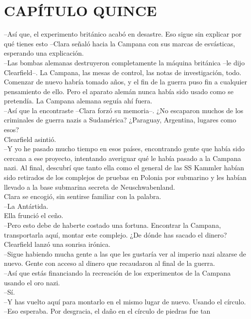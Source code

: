 \chapter*{CAPÍTULO QUINCE}
--Así que, el experimento británico acabó en desastre. Eso sigue sin
explicar por qué tienes esto --Clara señaló hacia la Campana con sus
marcas de esvásticas, esperando una explicación.\\
--Las bombas alemanas destruyeron completamente la máquina británica
--le dijo Clearfield--. La Campana, las mesas de control, las notas de
investigación, todo. Comenzar de nuevo habría tomado años, y el fin de
la guerra puso fin a cualquier pensamiento de ello. Pero el aparato
alemán nunca había sido usado como se pretendía. La Campana alemana
seguía ahí fuera.\\
--Así que la encontraste --Clara forzó su memoria--. ¿No escaparon
muchos de los criminales de guerra nazis a Sudamérica? ¿Paraguay,
Argentina, lugares como esos?\\
Clearfield asintió.\\
--Y yo he pasado mucho tiempo en esos países, encontrando gente que
había sido cercana a ese proyecto, intentando averiguar qué le había
pasado a la Campana nazi. Al final, descubrí que tanto ella como el
general de las SS Kammler habían sido retirados de los complejos de
pruebas en Polonia por submarino y les habían llevado a la base
submarina secreta de Neuschwabenland.\\
Clara se encogió, sin sentirse familiar con la palabra.\\
--La Antártida.\\
Ella frunció el ceño.\\
--Pero esto debe de haberte costado una fortuna. Encontrar la Campana,
transportarla aquí, montar este complejo. ¿De dónde has sacado el
dinero?\\
Clearfield lanzó una sonrisa irónica.\\
--Sigue habiendo mucha gente a las que les gustaría ver al imperio nazi
alzarse de nuevo. Gente con acceso al dinero que recaudaron al final de
la guerra.\\
--Así que estás financiando la recreación de los experimentos de la
Campana usando el oro nazi.\\
--Sí.\\
--Y has vuelto aquí para montarlo en el mismo lugar de nuevo. Usando el
círculo.\\
--Eso esperaba. Por desgracia, el daño en el círculo de piedras fue tan
